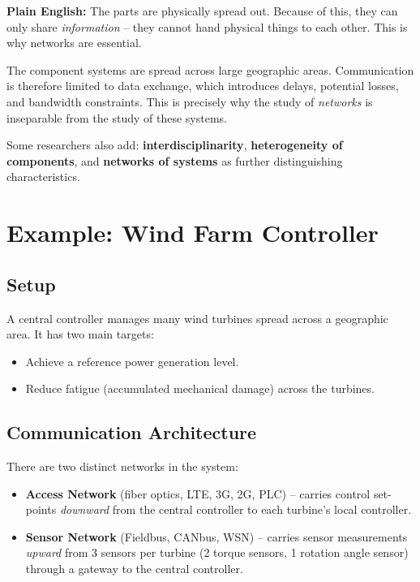 \begin{mdframed}[backgroundcolor=lightgray, linewidth=0pt, innertopmargin=6pt,
innerbottommargin=6pt]
\textbf{Plain English:} The parts are physically spread out. Because of this,
they can only share \emph{information} -- they cannot hand physical things to
each other. This is why networks are essential.
\end{mdframed}

The component systems are spread across large geographic areas. Communication
is therefore limited to data exchange, which introduces delays, potential
losses, and bandwidth constraints. This is precisely why the study of
\emph{networks} is inseparable from the study of these systems.

\vspace{1em}
Some researchers also add: \textbf{interdisciplinarity}, \textbf{heterogeneity
of components}, and \textbf{networks of systems} as further distinguishing
characteristics.

\section{Example: Wind Farm Controller}

\subsection{Setup}

A central controller manages many wind turbines spread across a geographic area.
It has two main targets:
\begin{itemize}[leftmargin=1.5em]
    \item Achieve a reference power generation level.
    \item Reduce fatigue (accumulated mechanical damage) across the turbines.
\end{itemize}

\subsection{Communication Architecture}

There are two distinct networks in the system:

\begin{itemize}[leftmargin=1.5em]
    \item \textbf{Access Network} (fiber optics, LTE, 3G, 2G, PLC) -- carries
    control set-points \emph{downward} from the central controller to each
    turbine's local controller.

    \item \textbf{Sensor Network} (Fieldbus, CANbus, WSN) -- carries sensor
    measurements \emph{upward} from 3 sensors per turbine (2 torque sensors,
    1 rotation angle sensor) through a gateway to the central controller.
\end{itemize}

